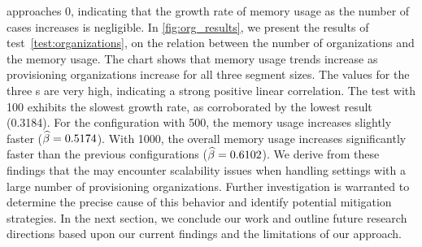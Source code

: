 approaches \num{0}, indicating that the growth rate of memory usage as the number of cases increases is negligible.
%
In \cref{fig:org_results}, we present the results of test~\ref{test:organizations}, on the relation between the number of organizations and the memory usage. The chart shows that memory usage trends increase as provisioning organizations increase for all three segment sizes. The {\Rlin} values for the three {\SegSize}s are very high, %
indicating a strong positive linear correlation. %
The test with {\SegSize} \num{100} exhibits the slowest growth rate, as corroborated by the lowest {\Slope} result (\num{0.3184}). 
For the configuration with {\SegSize} \num{500}, the memory usage increases slightly faster (${\widehat{\mathcal{\beta}}} = {0.5174}$). With {\SegSize} \num{1000}, the overall memory usage increases significantly faster than the previous configurations (${\widehat{\mathcal{\beta}}} = 0.6102$). We derive from these findings that the  may encounter scalability issues when handling settings with a large number of provisioning organizations. Further investigation is warranted to determine the precise cause of this behavior and identify potential mitigation strategies. In the next section, we conclude our work and outline future research directions based upon our current findings and the limitations of our approach.

